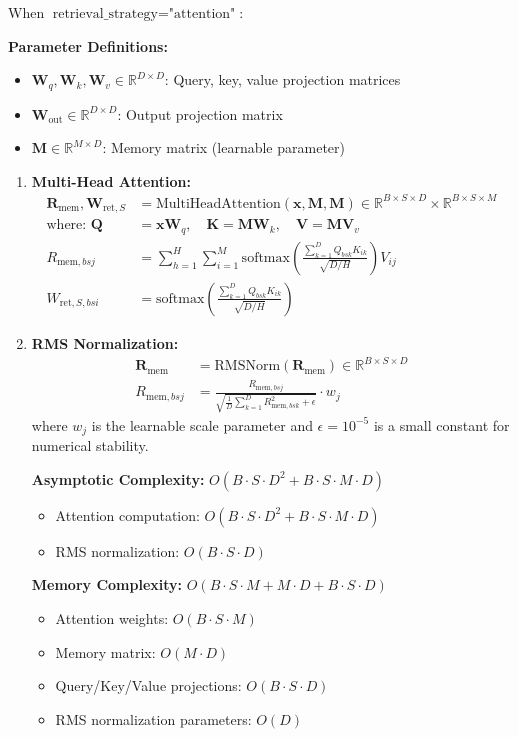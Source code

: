 \documentclass{article}
\begin{document}
When $\text{retrieval\_strategy} = \text{"attention"}$:

\textbf{Parameter Definitions:}
\begin{itemize}
\item $\mathbf{W}_q, \mathbf{W}_k, \mathbf{W}_v \in \mathbb{R}^{D \times D}$: Query, key, value projection matrices
\item $\mathbf{W}_{\text{out}} \in \mathbb{R}^{D \times D}$: Output projection matrix
\item $\mathbf{M} \in \mathbb{R}^{M \times D}$: Memory matrix (learnable parameter)
\end{itemize}

\begin{enumerate}
\item \textbf{Multi-Head Attention:}
\begin{align}
\mathbf{R}_{\text{mem}}, \mathbf{W}_{\text{ret},S} &= \text{MultiHeadAttention}(\mathbf{x}, \mathbf{M}, \mathbf{M}) \in \mathbb{R}^{B \times S \times D} \times \mathbb{R}^{B \times S \times M} \\
\text{where: } \mathbf{Q} &= \mathbf{x} \mathbf{W}_q, \quad \mathbf{K} = \mathbf{M} \mathbf{W}_k, \quad \mathbf{V} = \mathbf{M} \mathbf{V}_v \\
R_{\text{mem},bsj} &= \sum_{h=1}^{H} \sum_{i=1}^{M} \text{softmax}\left(\frac{\sum_{k=1}^{D} Q_{bsk} K_{ik}}{\sqrt{D/H}}\right) V_{ij} \\
W_{\text{ret},S,bsi} &= \text{softmax}\left(\frac{\sum_{k=1}^{D} Q_{bsk} K_{ik}}{\sqrt{D/H}}\right)
\end{align}

\item \textbf{RMS Normalization:}
\begin{align}
\mathbf{R}_{\text{mem}} &= \text{RMSNorm}(\mathbf{R}_{\text{mem}}) \in \mathbb{R}^{B \times S \times D} \\
R_{\text{mem},bsj} &= \frac{R_{\text{mem},bsj}}{\sqrt{\frac{1}{D}\sum_{k=1}^{D} R_{\text{mem},bsk}^2 + \epsilon}} \cdot w_j
\end{align}
where $w_j$ is the learnable scale parameter and $\epsilon = 10^{-5}$ is a small constant for numerical stability.

\textbf{Asymptotic Complexity:} $O(B \cdot S \cdot D^2 + B \cdot S \cdot M \cdot D)$
\begin{itemize}
\item Attention computation: $O(B \cdot S \cdot D^2 + B \cdot S \cdot M \cdot D)$
\item RMS normalization: $O(B \cdot S \cdot D)$
\end{itemize}

\textbf{Memory Complexity:} $O(B \cdot S \cdot M + M \cdot D + B \cdot S \cdot D)$
\begin{itemize}
\item Attention weights: $O(B \cdot S \cdot M)$
\item Memory matrix: $O(M \cdot D)$
\item Query/Key/Value projections: $O(B \cdot S \cdot D)$
\item RMS normalization parameters: $O(D)$
\end{itemize}
\end{enumerate}
\end{document}
